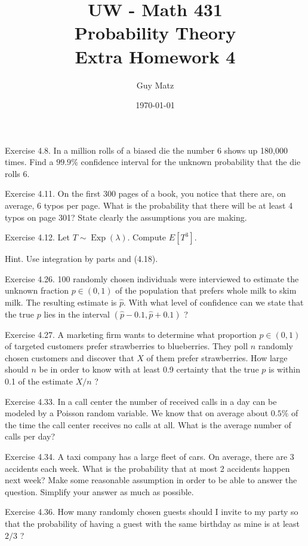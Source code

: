 \documentclass[10pt]{article}
\title{UW - Math 431 \\
Probability Theory \\
Extra Homework 4}
\author{Guy Matz}
\date{\today}
\begin{document}
\maketitle

\hfill \break
Exercise 4.8. In a million rolls of a biased die the number 6 shows up 180,000 times. Find a $99.9 \%$ confidence interval for the unknown probability that the die rolls 6.

\hfill \break
Exercise 4.11. On the first 300 pages of a book, you notice that there are, on average, 6 typos per page. What is the probability that there will be at least 4 typos on page 301? State clearly the assumptions you are making.

\hfill \break
Exercise 4.12. Let $T \sim \operatorname{Exp}(\lambda)$. Compute $E\left[T^{3}\right]$.

Hint. Use integration by parts and (4.18).

\hfill \break
Exercise 4.26. 100 randomly chosen individuals were interviewed to estimate the unknown fraction $p \in(0,1)$ of the population that prefers whole milk to skim milk. The resulting estimate is $\widehat{p}$. With what level of confidence can we state that the true $p$ lies in the interval $(\hat{p}-0.1, \hat{p}+0.1)$ ?

\hfill \break
Exercise 4.27. A marketing firm wants to determine what proportion $p \in(0,1)$ of targeted customers prefer strawberries to blueberries. They poll $n$ randomly chosen customers and discover that $X$ of them prefer strawberries. How large should $n$ be in order to know with at least 0.9 certainty that the true $p$ is within 0.1 of the estimate $X / n$ ?

\hfill \break
Exercise 4.33. In a call center the number of received calls in a day can be modeled by a Poisson random variable. We know that on average about $0.5 \%$ of the time the call center receives no calls at all. What is the average number of calls per day?

\hfill \break
Exercise 4.34. A taxi company has a large fleet of cars. On average, there are 3 accidents each week. What is the probability that at most 2 accidents happen next week? Make some reasonable assumption in order to be able to answer the question. Simplify your answer as much as possible.

\hfill \break
Exercise 4.36. How many randomly chosen guests should I invite to my party so that the probability of having a guest with the same birthday as mine is at least $2 / 3$ ?
\end{document}
